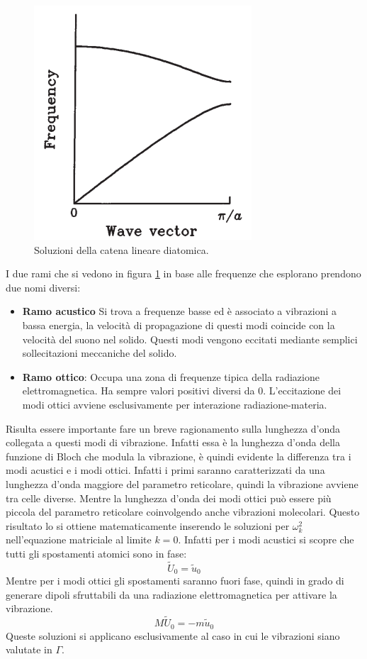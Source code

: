 \documentclass[oneside]{amsbook}
\numberwithin{section}{chapter}
\numberwithin{equation}{section}
\numberwithin{figure}{section}
\begin{document}
\begin{figure}[H]
\centering
\caption{Soluzioni della catena lineare diatomica.}\label{AA2}
\includegraphics[scale=0.5]{AA2}
\end{figure}
I due rami che si vedono in figura \ref{AA2} in base alle frequenze che esplorano prendono due nomi diversi:
\begin{itemize}
\item \textbf{Ramo acustico} Si trova a frequenze basse ed è associato a vibrazioni a bassa energia, la velocità di propagazione di questi modi coincide con la velocità del suono nel solido. Questi modi vengono eccitati mediante semplici sollecitazioni meccaniche del solido.
\item \textbf{Ramo ottico}: Occupa una zona di frequenze tipica della radiazione elettromagnetica. Ha sempre valori positivi diversi da $0$. L'eccitazione dei modi ottici avviene esclusivamente per interazione radiazione-materia.
\end{itemize}
Risulta essere importante fare un breve ragionamento sulla lunghezza d'onda collegata a questi modi di vibrazione. Infatti essa è la lunghezza d'onda della funzione di Bloch che modula la vibrazione, è quindi evidente la differenza tra i modi acustici e i modi ottici. Infatti i primi saranno caratterizzati da una lunghezza d'onda maggiore del parametro reticolare, quindi la vibrazione avviene tra celle diverse. Mentre la lunghezza d'onda dei modi ottici può essere più piccola del parametro reticolare coinvolgendo anche vibrazioni molecolari. Questo risultato lo si ottiene matematicamente inserendo le soluzioni per $\omega_k^2$ nell'equazione matriciale al limite $k=0$. Infatti per i modi acustici si scopre che tutti gli spostamenti atomici sono in fase:
\begin{equation}
\tilde{U}_0=\tilde{u}_0
\end{equation}
Mentre per i modi ottici gli spostamenti saranno fuori fase, quindi in grado di generare dipoli sfruttabili da una radiazione elettromagnetica per attivare la vibrazione.
\begin{equation}
M\tilde{U}_0=-m\tilde{u}_0
\end{equation}
Queste soluzioni si applicano esclusivamente al caso in cui le vibrazioni siano valutate in $\Gamma$.
\end{document}

